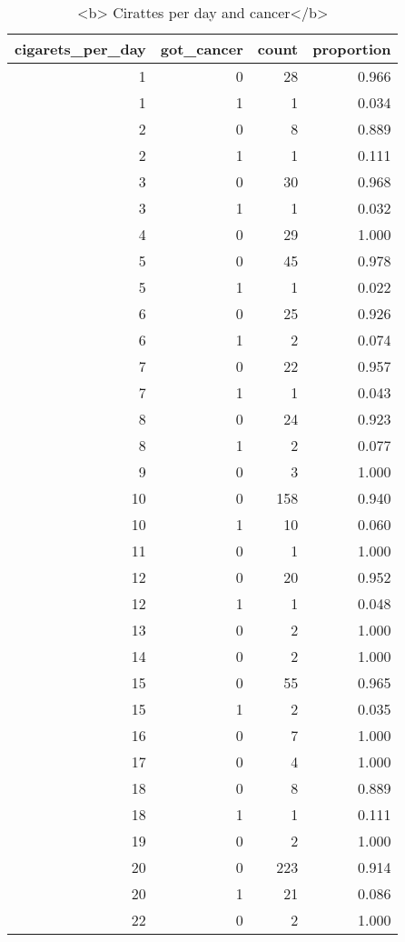 \documentclass[
]{article}
\begin{document}
\begin{table}

\caption{\label{tab:unnamed-chunk-111}<b> Cirattes per day and cancer</b>}
\centering
\begin{tabular}[t]{r|r|r|r}
\hline
cigarets\_per\_day & got\_cancer & count & proportion\\
\hline
1 & 0 & 28 & 0.966\\
\hline
1 & 1 & 1 & 0.034\\
\hline
2 & 0 & 8 & 0.889\\
\hline
2 & 1 & 1 & 0.111\\
\hline
3 & 0 & 30 & 0.968\\
\hline
3 & 1 & 1 & 0.032\\
\hline
4 & 0 & 29 & 1.000\\
\hline
5 & 0 & 45 & 0.978\\
\hline
5 & 1 & 1 & 0.022\\
\hline
6 & 0 & 25 & 0.926\\
\hline
6 & 1 & 2 & 0.074\\
\hline
7 & 0 & 22 & 0.957\\
\hline
7 & 1 & 1 & 0.043\\
\hline
8 & 0 & 24 & 0.923\\
\hline
8 & 1 & 2 & 0.077\\
\hline
9 & 0 & 3 & 1.000\\
\hline
10 & 0 & 158 & 0.940\\
\hline
10 & 1 & 10 & 0.060\\
\hline
11 & 0 & 1 & 1.000\\
\hline
12 & 0 & 20 & 0.952\\
\hline
12 & 1 & 1 & 0.048\\
\hline
13 & 0 & 2 & 1.000\\
\hline
14 & 0 & 2 & 1.000\\
\hline
15 & 0 & 55 & 0.965\\
\hline
15 & 1 & 2 & 0.035\\
\hline
16 & 0 & 7 & 1.000\\
\hline
17 & 0 & 4 & 1.000\\
\hline
18 & 0 & 8 & 0.889\\
\hline
18 & 1 & 1 & 0.111\\
\hline
19 & 0 & 2 & 1.000\\
\hline
20 & 0 & 223 & 0.914\\
\hline
20 & 1 & 21 & 0.086\\
\hline
22 & 0 & 2 & 1.000\\
\hline

\end{tabular}
\end{table}
\end{document}
